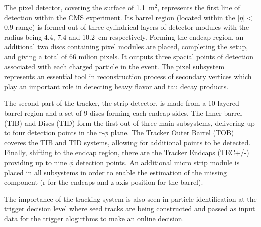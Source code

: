 \hspace{10pt} The pixel detector, covering the surface of 1.1~m$^{\text{2}}$, represents the first line of detection within the CMS experiment. Its barrel region (located within the $|\eta|<$0.9 range) is formed out of three cylindrical layers of detector modules with the radius being 4.4, 7.4 and 10.2~cm respectively. Forming the endcap region, an additional two discs containing pixel modules are placed, completing the setup, and giving a total of 66 milion pixels. It outputs three spacial points of detection associated with each charged particle in the event. The pixel subsystem represents an essential tool in reconstruction process of secondary vertices which play an important role in detecting heavy flavor and tau decay products. 

\hspace{10pt} The second part of the tracker, the strip detector, is made from a 10 layered barrel region and a set of 9 discs forming each endcap sides. The Inner barrel (TIB) and Discs (TID) form the first out of three main subsystems, delivering up to four detection points in the r-$\phi$ plane. The Tracker Outer Barrel (TOB) coveres the TIB and TID systems, allowing for additional points to be detected. Finally, shifting to the endcap region, there are the Tracker Endcaps (TEC+/-) providing up to nine $\phi$ detection points. An additional micro strip module is placed in all subsystems in order to enable the estimation of the missing component (r for the endcaps and z-axis position for the barrel).

\hspace{10pt} The importance of the tracking system is also seen in particle identification at the trigger decision level where seed tracks are being constructed and passed as input data for the  trigger alogirthms to make an online decision.



